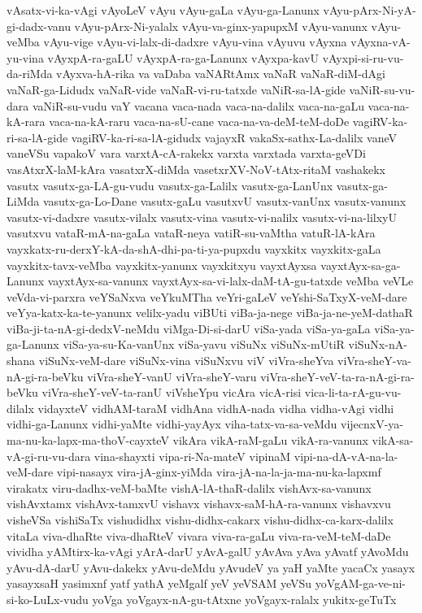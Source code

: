 {vAsatx-vi-ka-vAgi
vAyoLeV
vAyu
vAyu-gaLa
vAyu-ga-Lanunx
vAyu-pArx-Ni-yA-gi-dadx-vanu
vAyu-pArx-Ni-yalalx
vAyu-va-ginx-yapupxM
vAyu-vanunx
vAyu-veMba
vAyu-vige
vAyu-vi-lalx-di-dadxre
vAyu-vina
vAyuvu
vAyxna
vAyxna-vA-yu-vina
vAyxpA-ra-gaLU
vAyxpA-ra-ga-Lanunx
vAyxpa-kavU
vAyxpi-si-ru-vu-da-riMda
vAyxva-hA-rika
va
vaDaba
vaNARtAmx
vaNaR
vaNaR-diM-dAgi
vaNaR-ga-Lidudx
vaNaR-vide
vaNaR-vi-ru-tatxde
vaNiR-sa-lA-gide
vaNiR-su-vu-dara
vaNiR-su-vudu
vaY
vacana
vaca-nada
vaca-na-dalilx
vaca-na-gaLu
vaca-na-kA-rara
vaca-na-kA-raru
vaca-na-sU-cane
vaca-na-va-deM-teM-doDe
vagiRV-ka-ri-sa-lA-gide
vagiRV-ka-ri-sa-lA-gidudx
vajayxR
vakaSx-sathx-La-dalilx
vaneV
vaneVSu
vapakoV
vara
varxtA-cA-rakekx
varxta
varxtada
varxta-geVDi
vasAtxrX-laM-kAra
vasatxrX-diMda
vasetxrXV-NoV-tAtx-ritaM
vashakekx
vasutx
vasutx-ga-LA-gu-vudu
vasutx-ga-Lalilx
vasutx-ga-LanUnx
vasutx-ga-LiMda
vasutx-ga-Lo-Dane
vasutx-gaLu
vasutxvU
vasutx-vanUnx
vasutx-vanunx
vasutx-vi-dadxre
vasutx-vilalx
vasutx-vina
vasutx-vi-nalilx
vasutx-vi-na-lilxyU
vasutxvu
vataR-mA-na-gaLa
vataR-neya
vatiR-su-vaMtha
vatuR-lA-kAra
vayxkatx-ru-derxY-kA-da-shA-dhi-pa-ti-ya-pupxdu
vayxkitx
vayxkitx-gaLa
vayxkitx-tavx-veMba
vayxkitx-yanunx
vayxkitxyu
vayxtAyxsa
vayxtAyx-sa-ga-Lanunx
vayxtAyx-sa-vanunx
vayxtAyx-sa-vi-lalx-daM-tA-gu-tatxde
veMba
veVLe
veVda-vi-parxra
veYSaNxva
veYkuMTha
veYri-gaLeV
veYshi-SaTxyX-veM-dare
veYya-katx-ka-te-yanunx
velilx-yadu
viBUti
viBa-ja-nege
viBa-ja-ne-yeM-dathaR
viBa-ji-ta-nA-gi-dedxV-neMdu
viMga-Di-si-darU
viSa-yada
viSa-ya-gaLa
viSa-ya-ga-Lanunx
viSa-ya-su-Ka-vanUnx
viSa-yavu
viSuNx
viSuNx-mUtiR
viSuNx-nA-shana
viSuNx-veM-dare
viSuNx-vina
viSuNxvu
viV
viVra-sheYva
viVra-sheY-va-nA-gi-ra-beVku
viVra-sheY-vanU
viVra-sheY-varu
viVra-sheY-veV-ta-ra-nA-gi-ra-beVku
viVra-sheY-veV-ta-ranU
viVsheYpu
vicAra
vicA-risi
vica-li-ta-rA-gu-vu-dilalx
vidayxteV
vidhAM-taraM
vidhAna
vidhA-nada
vidha
vidha-vAgi
vidhi
vidhi-ga-Lanunx
vidhi-yaMte
vidhi-yayAyx
viha-tatx-va-sa-veMdu
vijecnxV-ya-ma-nu-ka-lapx-ma-thoV-cayxteV
vikAra
vikA-raM-gaLu
vikA-ra-vanunx
vikA-sa-vA-gi-ru-vu-dara
vina-shayxti
vipa-ri-Na-mateV
vipinaM
vipi-na-dA-vA-na-la-veM-dare
vipi-nasayx
vira-jA-ginx-yiMda
vira-jA-na-la-ja-ma-nu-ka-lapxmf
virakatx
viru-dadhx-veM-baMte
vishA-lA-thaR-dalilx
vishAvx-sa-vanunx
vishAvxtamx
vishAvx-tamxvU
vishavx
vishavx-saM-hA-ra-vanunx
vishavxvu
visheVSa
vishiSaTx
vishudidhx
vishu-didhx-cakarx
vishu-didhx-ca-karx-dalilx
vitaLa
viva-dhaRte
viva-dhaRteV
vivara
viva-ra-gaLu
viva-ra-veM-teM-daDe
vividha
yAMtirx-ka-vAgi
yArA-darU
yAvA-galU
yAvAva
yAva
yAvatf
yAvoMdu
yAvu-dA-darU
yAvu-dakekx
yAvu-deMdu
yAvudeV
ya
yaH
yaMte
yacaCx
yasayx
yasayxsaH
yasimxnf
yatf
yathA
yeMgalf
yeV
yeVSAM
yeVSu
yoVgAM-ga-ve-ni-si-ko-LuLx-vudu
yoVga
yoVgayx-nA-gu-tAtxne
yoVgayx-ralalx
yukitx-geTuTx
}
